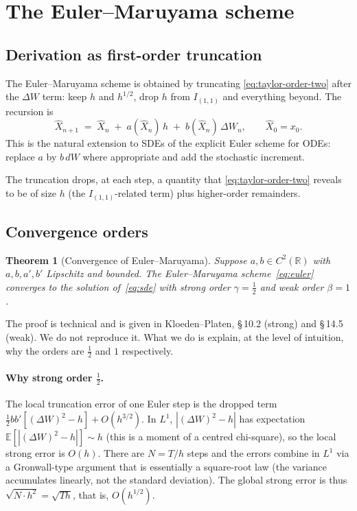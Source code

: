 \documentclass[11pt,a4paper]{article}
\theoremstyle{plain}
\newtheorem{theorem}{Theorem}[section]
\theoremstyle{definition}
\theoremstyle{remark}
\newcommand{\R}{\mathbb{R}}
\newcommand{\E}{\mathbb{E}}
\begin{document}
\section{The Euler--Maruyama scheme}
\label{sec:euler}

\subsection{Derivation as first-order truncation}

The Euler--Maruyama scheme is obtained by truncating
\eqref{eq:taylor-order-two} after the $\Delta W$ term: keep $h$ and
$h^{1/2}$, drop $h$ from $I_{(1,1)}$ and everything beyond. The
recursion is
\begin{equation}
\label{eq:euler}
\hat X_{n+1} \;=\; \hat X_n
\;+\; a(\hat X_n)\, h
\;+\; b(\hat X_n)\, \Delta W_n,
\qquad \hat X_0 = x_0.
\end{equation}
This is the natural extension to SDEs of the explicit Euler scheme
for ODEs: replace $a$ by $b\, dW$ where appropriate and add the
stochastic increment.

The truncation drops, at each step, a quantity that
\eqref{eq:taylor-order-two} reveals to be of size $h$ (the
$I_{(1,1)}$-related term) plus higher-order remainders.

\subsection{Convergence orders}

\begin{theorem}[Convergence of Euler--Maruyama]
\label{thm:euler-conv}
Suppose $a, b \in C^2(\R)$ with $a, b, a', b'$ Lipschitz and bounded.
The Euler--Maruyama scheme~\eqref{eq:euler} converges to the solution
of~\eqref{eq:sde} with strong order $\gamma = \tfrac{1}{2}$ and weak
order $\beta = 1$.
\end{theorem}

The proof is technical and is given in Kloeden--Platen,
\S\,10.2 (strong) and \S\,14.5 (weak). We do not reproduce it. What
we do is explain, at the level of intuition, why the orders are
$\tfrac{1}{2}$ and $1$ respectively.

\paragraph{Why strong order $\tfrac{1}{2}$.} The local truncation
error of one Euler step is the dropped term
$\tfrac{1}{2} b b' [(\Delta W)^2 - h] + O(h^{3/2})$.
In $L^1$, $|(\Delta W)^2 - h|$ has expectation
$\E[|(\Delta W)^2 - h|] \sim h$ (this is a moment of a centred chi-square), so the local
strong error is $O(h)$. There are $N = T/h$ steps and the errors
combine in $L^1$ via a Gronwall-type argument that is essentially a
square-root law (the variance accumulates linearly, not the standard
deviation). The global strong error is thus $\sqrt{N \cdot h^2} =
\sqrt{T h}$, that is, $O(h^{1/2})$.
\end{document}
